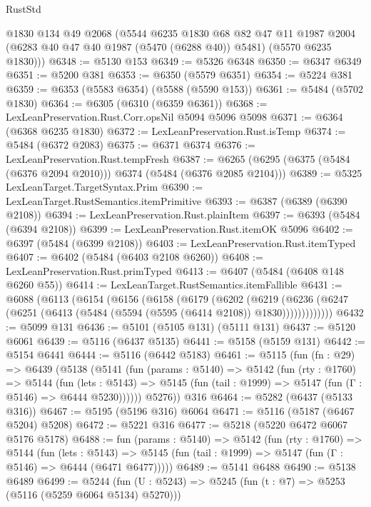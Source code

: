 \begin{lexlean}{RustStd}
\begin{coremodule}
      @1830
      @134
      @49
      @2068
      (@5544
        @6235
        @1830
        @68
        @82
        @47
        @11
        @1987
        @2004
        (@6283 @40 @47 @40 @1987 (@5470 (@6288 @40)) @5481)
        (@5570 @6235 @1830)))
@6348 := @5130 @153
@6349 := @5326 @6348
@6350 := @6347 @6349
@6351 := @5200 @381
@6353 := @6350 (@5579 @6351)
@6354 := @5224 @381
@6359 := @6353 (@5583 @6354) (@5588 (@5590 @153))
@6361 := @5484 (@5702 @1830)
@6364 := @6305 (@6310 (@6359 @6361))
@6368 := LexLeanPreservation.Rust.Corr.opsNil @5094 @5096 @5098
@6371 := @6364 (@6368 @6235 @1830)
@6372 := LexLeanPreservation.Rust.isTemp
@6374 := @5484 (@6372 @2083)
@6375 := @6371 @6374
@6376 := LexLeanPreservation.Rust.tempFresh
@6387 := @6265 (@6295 (@6375 (@5484 (@6376 @2094 @2010))) @6374 (@5484 (@6376 @2085 @2104)))
@6389 := @5325 LexLeanTarget.TargetSyntax.Prim
@6390 := LexLeanTarget.RustSemantics.itemPrimitive
@6393 := @6387 (@6389 (@6390 @2108))
@6394 := LexLeanPreservation.Rust.plainItem
@6397 := @6393 (@5484 (@6394 @2108))
@6399 := LexLeanPreservation.Rust.itemOK @5096
@6402 := @6397 (@5484 (@6399 @2108))
@6403 := LexLeanPreservation.Rust.itemTyped
@6407 := @6402 (@5484 (@6403 @2108 @6260))
@6408 := LexLeanPreservation.Rust.primTyped
@6413 := @6407 (@5484 (@6408 @148 @6260 @55))
@6414 := LexLeanTarget.RustSemantics.itemFallible
@6431 := @6088
    (@6113
      (@6154
        (@6156
          (@6158
            (@6179
              (@6202
                (@6219
                  (@6236 (@6247 (@6251 (@6413 (@5484 (@5594 (@5595 (@6414 @2108)) @1830)))))))))))))
@6432 := @5099 @131
@6436 := @5101 (@5105 @131) (@5111 @131)
@6437 := @5120 @6061
@6439 := @5116 (@6437 @5135)
@6441 := @5158 (@5159 @131)
@6442 := @5154 @6441
@6444 := @5116 (@6442 @5183)
@6461 := @5115
    (fun (fn : @29) =>
    @6439
      (@5138
        (@5141
          (fun (params : @5140) =>
          @5142
            (fun (rty : @1760) =>
            @5144
              (fun (lets : @5143) =>
              @5145 (fun (tail : @1999) => @5147 (fun (Γ : @5146) => @6444 @5230))))))
        @5276))
    @316
@6464 := @5282 (@6437 (@5133 @316))
@6467 := @5195 (@5196 @316) @6064
@6471 := @5116 (@5187 (@6467 @5204) @5208)
@6472 := @5221 @316
@6477 := @5218 (@5220 @6472 @6067 @5176 @5178)
@6488 := fun (params : @5140) =>
  @5142
    (fun (rty : @1760) =>
    @5144
      (fun (lets : @5143) =>
      @5145 (fun (tail : @1999) => @5147 (fun (Γ : @5146) => @6444 (@6471 @6477)))))
@6489 := @5141 @6488
@6490 := @5138 @6489
@6499 := @5244 (fun (U : @5243) => @5245 (fun (t : @7) => @5253 (@5116 (@5259 @6064 @5134) @5270)))

\end{coremodule}
\end{lexlean}
